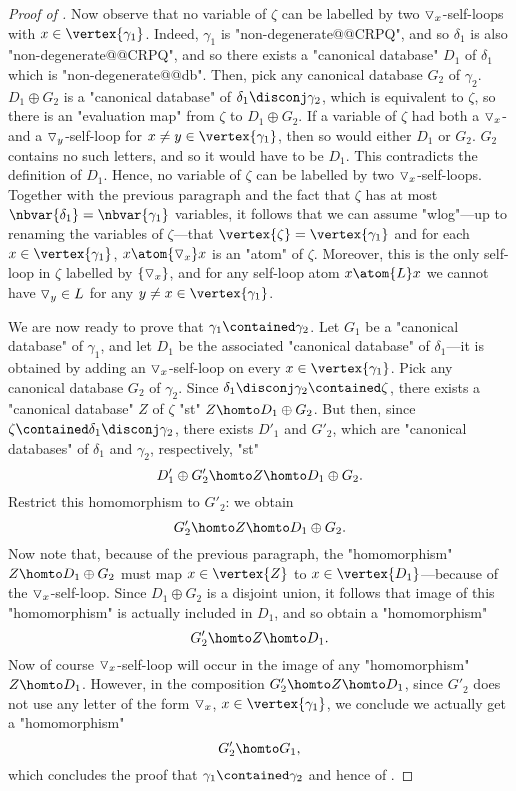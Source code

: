 \begin{proof}[Proof of ]
	Now observe that no variable of $\zeta$ can be labelled by two $\triangledown_x$-self-loops
	with $x\in\vertex{\gamma_1}$. Indeed, $\gamma_1$ is "non-degenerate@@CRPQ", and so $\delta_1$
	is also "non-degenerate@@CRPQ", and so there
	exists a "canonical database" $D_1$ of $\delta_1$ which is "non-degenerate@@db".
	Then, pick any canonical database $G_2$ of $\gamma_2$.
	$D_1 \oplus G_2$ is a "canonical database" of $\delta_1 \disconj \gamma_2$, which is 
	equivalent to $\zeta$, so there is an "evaluation map"
	from $\zeta$ to $D_1 \oplus G_2$. If a variable of $\zeta$ had both a
	$\triangledown_x$- and a $\triangledown_y$-self-loop for $x \neq y \in \vertex{\gamma_1}$,
	then so would either $D_1$ or $G_2$. $G_2$ contains no such letters, and so it would have
	to be $D_1$. This contradicts the definition of $D_1$.
	Hence, no variable of $\zeta$ can be labelled by two $\triangledown_x$-self-loops.
	Together with the previous paragraph and the fact that 
	$\zeta$ has at most $\nbvar{\delta_1} = \nbvar{\gamma_1}$ variables, it follows that
	we can assume "wlog"---up to renaming the variables of $\zeta$---that
	$\vertex{\zeta} = \vertex{\gamma_1}$ and for each $x \in \vertex{\gamma_1}$,
	$x \atom{\marking_x} x$ is an "atom" of $\zeta$. Moreover, this is the only self-loop in
	$\zeta$ labelled by $\{\triangledown_x\}$, and for any self-loop atom $x \atom{L} x$
	we cannot have $\triangledown_y \in L$ for any $y \neq x \in \vertex{\gamma_1}$. 
	
	We are now ready to prove that $\gamma_1 \contained \gamma_2$.
	Let $G_1$ be a "canonical database" of $\gamma_1$, and let $D_1$ be the associated
	"canonical database" of $\delta_1$---it is obtained by adding an $\triangledown_x$-self-loop
	on every $x \in \vertex{\gamma_1}$.
	Pick any canonical database $G_2$ of $\gamma_2$. Since $\delta_1 \disconj \gamma_2 \contained \zeta$, there exists a "canonical database" $Z$ of $\zeta$
	"st" $Z \homto D_1 \oplus G_2$.
	But then, since $\zeta \contained \delta_1 \disconj \gamma_2$, there exists
	$D'_1$ and $G'_2$, which are "canonical databases" of $\delta_1$ and $\gamma_2$,
	respectively, "st"
	\[
		D'_1 \oplus G'_2 \homto
		Z \homto
		D_1 \oplus G_2.
	\]
	Restrict this homomorphism to $G'_2$: we obtain 
	\[
		G'_2 \homto
		Z \homto
		D_1 \oplus G_2.
	\]
	Now note that, because of the previous paragraph,
	the "homomorphism" $Z \homto D_1 \oplus G_2$ must map $x \in \vertex{Z}$  
	to $x \in \vertex{D_1}$---because of the $\triangledown_x$-self-loop.
	Since $D_1 \oplus G_2$ is a disjoint union, it follows that image of this
	"homomorphism" is actually included in $D_1$, and so obtain a "homomorphism"
	\[
		G'_2 \homto Z \homto D_1.
	\]
	Now of course $\triangledown_x$-self-loop will occur in the image of any "homomorphism"
	$Z \homto D_1$. However, in the composition $G'_2 \homto Z \homto D_1$,
	since $G'_2$ does not use any letter of the form $\triangledown_x$, $x\in \vertex{\gamma_1}$,
	we conclude we actually get a "homomorphism"
	\[
		G'_2 \homto G_1,
	\]
	which concludes the proof that $\gamma_1 \contained \gamma_2$
	and hence of .
	

\end{proof}
